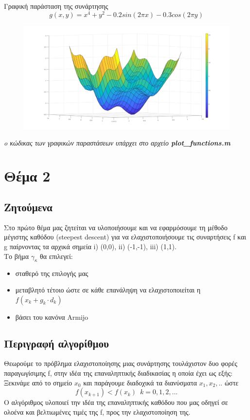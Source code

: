 \documentclass{article}
\begin{document}
Γραφική παράσταση της συνάρτησης 
\begin{equation*}
g(x,y) = x^4 + y^2 - 0.2sin(2πx) - 0.3cos(2πy)
\end{equation*}
\begin{figure}[h!]	
     \centering  
     \advance\leftskip-0.2cm  
  \includegraphics[width=130mm,scale=2]{functionG.jpg}
\end{figure} 

\textit{o κώδικας των γραφικών παραστάσεων υπάρχει στο αρχείο \textbf{plot\_functions.m}}
\clearpage
\section*{Θέμα 2}
\subsection*{Ζητούμενα}
Στο πρώτο θέμα μας ζητείται να υλοποιήσουμε και να εφαρμόσουμε τη μέθοδο μέγιστης καθόδου (steepest descent) για να ελαχιστοποιήσουμε τις συναρτήσεις f και g παίρνοντας τα αρχικά σημεία i) (0,0), ii) (-1,-1), iii) (1,1).\\Το βήμα $γ_κ$ θα επιλεγεί:
\begin{itemize}
\item σταθερό της επιλογής μας
\item μεταβλητό τέτοιο ώστε σε κάθε επανάληψη να ελαχιστοποιείται η $f(x_k+g_k \cdot d_k )$ 
\item  βάσει του κανόνα Armijo
\end{itemize}
\subsection*{Περιγραφή αλγορίθμου}
Θεωρούμε το πρόβλημα ελαχιστοποίησης μιας συνάρτησης τουλάχιστον δυο φορές παραγωγίσιμης f, στην ιδέα της επαναληπτικής διαδικασίας η οποία έχει ως εξής:\\
Ξεκινάμε από το σημείο $x_0$ και παράγουμε διαδοχικά τα διανύσματα $x_1,x_2,..$ ώστε
\begin{equation*}
f(x_{k+1}) < f(x_k) \enspace k=0,1,2,...
\end{equation*} 
Ο αλγόριθμος υλοποιεί την ιδέα της επαναληπτικής καθόδου που μας οδηγεί σε ολοένα και βελτιωμένες τιμές της f, προς την ελαχιστοποίηση της.
\end{document}
